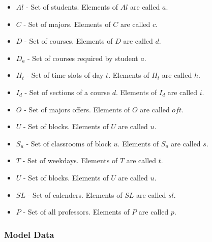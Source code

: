 \begin{itemize}
\item $Al$ - Set of students. Elements of $Al$ are called $a$.
\item $C$ - Set of majors. Elements of $C$ are called $c$.
\item $D$ - Set of courses. Elements of $D$ are called $d$.
\item $D_{a}$ - Set of courses required by student $a$.
\item $H_{t}$ - Set of time slots of day $t$. Elements of $H_{t}$ are called $h$.
\item $I_{d}$ - Set of sections of a course $d$. Elements of $I_{d}$ are called $i$.
\item $O$ - Set of majors offers. Elements of $O$ are called $oft$.
\item $U$ - Set of blocks. Elements of $U$ are called $u$.
\item $S_{u}$ - Set of classrooms of block $u$. Elements of $S_{u}$ are called $s$.
\item $T$ - Set of weekdays. Elements of $T$ are called $t$.
\item $U$ - Set of blocks. Elements of $U$ are called $u$.
\item $SL$ - Set of calenders. Elements of $SL$ are called $sl$.
\item $P$ - Set of all professors. Elements of $P$ are called $p$.
\end{itemize}

\subsubsection{Model Data}

